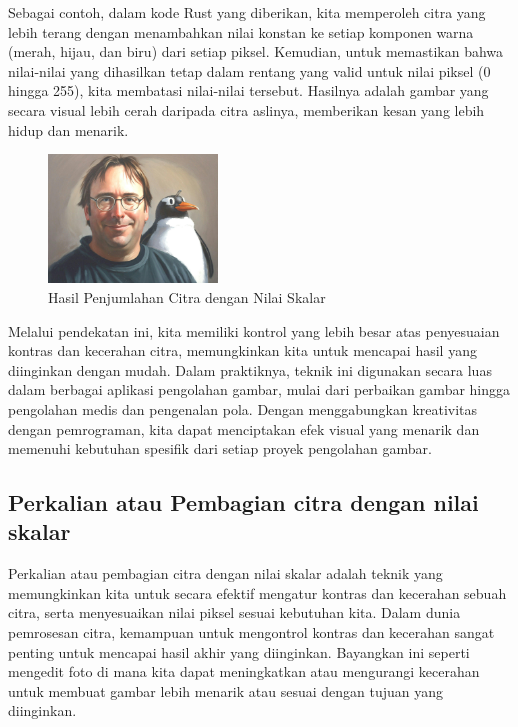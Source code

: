 \documentclass[a4paper,12pt,openany]{book}
\begin{document}
Sebagai contoh, dalam kode Rust yang diberikan, kita memperoleh citra yang lebih terang dengan menambahkan nilai konstan ke setiap komponen warna (merah, hijau, dan biru) dari setiap piksel. Kemudian, untuk memastikan bahwa nilai-nilai yang dihasilkan tetap dalam rentang yang valid untuk nilai piksel (0 hingga 255), kita membatasi nilai-nilai tersebut. Hasilnya adalah gambar yang secara visual lebih cerah daripada citra aslinya, memberikan kesan yang lebih hidup dan menarik.

\begin{figure}[H]
    \centering
    \includegraphics[width=0.4\textwidth]{./image/arithmetic/result-addition-scalar.jpg}
    \caption{Hasil Penjumlahan Citra dengan Nilai Skalar}
\end{figure}

Melalui pendekatan ini, kita memiliki kontrol yang lebih besar atas penyesuaian kontras dan kecerahan citra, memungkinkan kita untuk mencapai hasil yang diinginkan dengan mudah. Dalam praktiknya, teknik ini digunakan secara luas dalam berbagai aplikasi pengolahan gambar, mulai dari perbaikan gambar hingga pengolahan medis dan pengenalan pola. Dengan menggabungkan kreativitas dengan pemrograman, kita dapat menciptakan efek visual yang menarik dan memenuhi kebutuhan spesifik dari setiap proyek pengolahan gambar.

\subsection{Perkalian atau Pembagian citra dengan nilai skalar}
Perkalian atau pembagian citra dengan nilai skalar adalah teknik yang memungkinkan kita untuk secara efektif mengatur kontras dan kecerahan sebuah citra, serta menyesuaikan nilai piksel sesuai kebutuhan kita. Dalam dunia pemrosesan citra, kemampuan untuk mengontrol kontras dan kecerahan sangat penting untuk mencapai hasil akhir yang diinginkan. Bayangkan ini seperti mengedit foto di mana kita dapat meningkatkan atau mengurangi kecerahan untuk membuat gambar lebih menarik atau sesuai dengan tujuan yang diinginkan.
\end{document}
